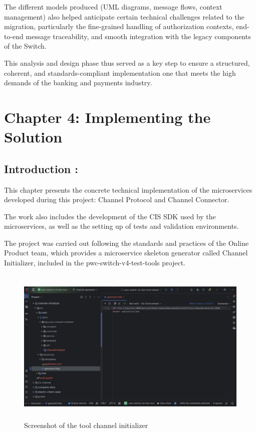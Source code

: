 \documentclass[12pt,a4paper]{report}
\begin{document}
The different models produced (UML diagrams, message flows, context
management) also helped anticipate certain technical challenges related
to the migration, particularly the fine-grained handling of
authorization contexts, end-to-end message traceability, and smooth
integration with the legacy components of the Switch.

This analysis and design phase thus served as a key step to ensure a
structured, coherent, and standards-compliant implementation one that
meets the high demands of the banking and payments industry.



\clearpage

\section{Chapter 4: Implementing the Solution}


\subsection{Introduction
:}

This chapter presents the concrete technical implementation of the
microservices developed during this project: Channel Protocol and
Channel Connector.

The work also includes the development of the CIS SDK used by the
microservices, as well as the setting up of tests and validation
environments.

The project was carried out following the standards and practices of the
Online Product team, which provides a microservice skeleton generator
called Channel Initializer, included in the pwc-switch-v4-test-tools
project.



\begin{figure}[H]
\centering
\includegraphics[width=5.29167in,height=2.97881in]{media/image61.jpeg}
\caption{Screenshot of the tool channel initializer}
\label{fig:TCI}
\end{figure} 
\end{document}
